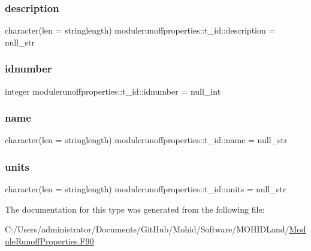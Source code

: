 \subsubsection{\texorpdfstring{description}{description}}
{\footnotesize\ttfamily character(len = stringlength) modulerunoffproperties\+::t\+\_\+id\+::description = null\+\_\+str\hspace{0.3cm}{\ttfamily [private]}}

\mbox{\label{structmodulerunoffproperties_1_1t__id_a7f927d1e72a7dcd9b24ee265d9cc7097}} 
\subsubsection{\texorpdfstring{idnumber}{idnumber}}
{\footnotesize\ttfamily integer modulerunoffproperties\+::t\+\_\+id\+::idnumber = null\+\_\+int\hspace{0.3cm}{\ttfamily [private]}}

\mbox{\label{structmodulerunoffproperties_1_1t__id_a435deca38e9ca27542b7b62d14c62af8}} 
\subsubsection{\texorpdfstring{name}{name}}
{\footnotesize\ttfamily character(len = stringlength) modulerunoffproperties\+::t\+\_\+id\+::name = null\+\_\+str\hspace{0.3cm}{\ttfamily [private]}}

\mbox{\label{structmodulerunoffproperties_1_1t__id_a3f98e0304ffc34376a7cd3013bb65292}} 
\subsubsection{\texorpdfstring{units}{units}}
{\footnotesize\ttfamily character(len = stringlength) modulerunoffproperties\+::t\+\_\+id\+::units = null\+\_\+str\hspace{0.3cm}{\ttfamily [private]}}



The documentation for this type was generated from the following file\+:\begin{DoxyCompactItemize}
\item 
C\+:/\+Users/administrator/\+Documents/\+Git\+Hub/\+Mohid/\+Software/\+M\+O\+H\+I\+D\+Land/\mbox{\hyperlink{_module_runoff_properties_8_f90}{Module\+Runoff\+Properties.\+F90}}\end{DoxyCompactItemize}

